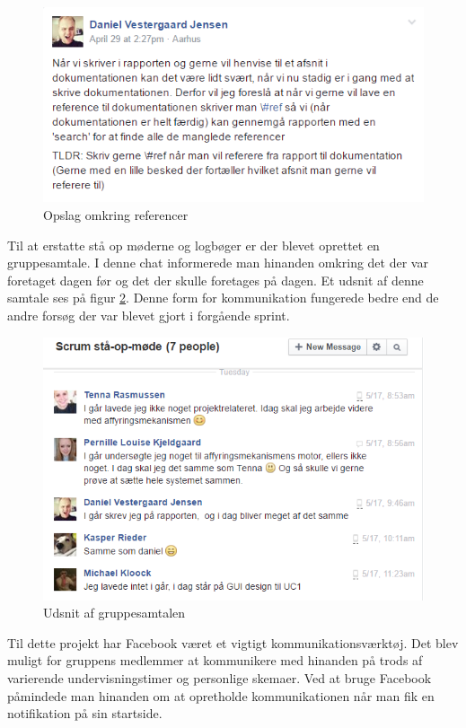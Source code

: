 \begin{figure}[H]
	\centering
	\includegraphics[scale=0.6]{Projektgennemfoerelse/images/fblatex}
	\caption{Opslag omkring referencer}
	\label{ref:fblatex}
\end{figure}

Til at erstatte stå op møderne og logbøger er der blevet oprettet en gruppesamtale. I denne chat informerede man hinanden omkring det der var foretaget dagen før og det der skulle foretages på dagen. Et udsnit af denne samtale ses på figur \ref{ref:fbchat}. Denne form for kommunikation fungerede bedre end de andre forsøg der var blevet gjort i forgående sprint. 

\begin{figure}[H]
	\centering
	\includegraphics[scale=0.6]{Projektgennemfoerelse/images/fbstandup}
	\caption{Udsnit af gruppesamtalen}
	\label{ref:fbchat}
\end{figure}

Til dette projekt har Facebook været et vigtigt kommunikationsværktøj. Det blev muligt for gruppens medlemmer at kommunikere med hinanden på trods af varierende undervisningstimer og personlige skemaer. Ved at bruge Facebook påmindede man hinanden om at opretholde kommunikationen når man fik en notifikation på sin startside.

